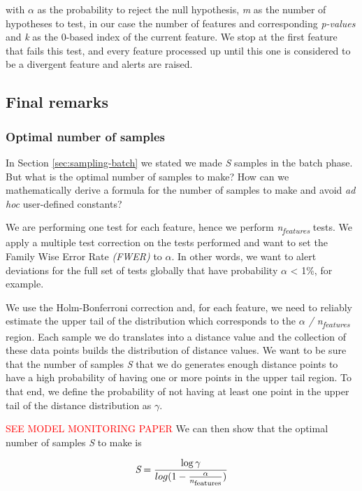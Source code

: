 with $\alpha$ as the probability to reject the null hypothesis, \textit{m} as the number of hypotheses to test, in our case the number of features and corresponding \textit{p-values} and \textit{k} as the 0-based index of the current feature. We stop at the first feature that fails this test, and every feature processed up until this one is considered to be a divergent feature and alerts are raised.

\subsection{Final remarks}

\subsubsection*{Optimal number of samples}
In Section \ref{sec:sampling-batch} we stated we made \textit{S} samples in the batch phase. But what is the optimal number of samples to make? How can we mathematically derive a formula for the number of samples to make and avoid \textit{ad hoc} user-defined constants?

We are performing one test for each feature, hence we perform \textit{n\textsubscript{features}} tests. We apply a multiple test correction on the tests performed and want to set the Family Wise Error Rate \textit{(FWER)} to $\alpha$. In other words, we want to alert deviations for the full set of tests globally that have probability $\alpha$ < 1\%, for example.

We use the Holm-Bonferroni correction and, for each feature, we need to reliably estimate the upper tail of the distribution which corresponds to the \textit{$\alpha$ / n\textsubscript{features}} region. Each sample we do translates into a distance value and the collection of these data points builds the distribution of distance values. We want to be sure that the number of samples \textit{S} that we do generates enough distance points to have a high probability of having one or more points in the upper tail region. To that end, we define the probability of not having at least one point in the upper tail of the distance distribution as $\gamma$. 

\textcolor{red}{SEE MODEL MONITORING PAPER} We can then show that the optimal number of samples \textit{S} to make is

\begin{equation}
    \label{eq:optimal-n-samples}
    \textit{S} = \frac{\log\gamma}{log(1 - \frac{\alpha}{n\textsubscript{features}})}
\end{equation}





